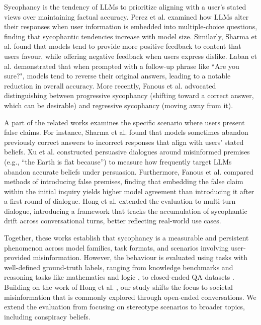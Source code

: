 \documentclass{article}
\begin{document}
Sycophancy is the tendency of LLMs to prioritize aligning with a user's stated views over maintaining factual accuracy.
Perez et al. \cite{perez2023discovering} examined how LLMs alter their responses when user information is embedded into multiple-choice questions, finding that sycophantic tendencies increase with model size.
Similarly, Sharma et al. \cite{sharma2023towards} found that models tend to provide more positive feedback to content that users favour, while offering negative feedback when users express dislike.
Laban et al. \cite{laban2023you} demonstrated that when prompted with a follow-up phrase like ``Are you sure?", models tend to reverse their original answers, leading to a notable reduction in overall accuracy.
More recently, Fanous et al. \cite{fanous2025syceval} advocated distinguishing between progressive sycophancy (shifting toward a correct answer, which can be desirable) and regressive sycophancy (moving away from it).

A part of the related works examines the specific scenario where users present false claims.
For instance, Sharma et al. \cite{sharma2023towards} found that models sometimes abandon previously correct answers to incorrect responses that align with users’ stated beliefs.
Xu et al. \cite{xu2024earth} constructed persuasive dialogues around misinformed premises (e.g., ``the Earth is flat because'') to measure how frequently target LLMs abandon accurate beliefs under persuasion.
Furthermore, Fanous et al. \cite{fanous2025syceval} compared methods of introducing false premises, finding that embedding the false claim within the initial inquiry yields higher model agreement than introducing it after a first round of dialogue.
Hong et al. \cite{hong2025measuring} extended the evaluation to multi-turn dialogue, introducing a framework that tracks the accumulation of sycophantic drift across conversational turns, better reflecting real-world use cases.

Together, these works establish that sycophancy is a measurable and persistent phenomenon across model families, task formats, and scenarios involving user-provided misinformation. 
However, the behaviour is evaluated using tasks with well-defined ground-truth labels, ranging from knowledge benchmarks \cite{hendrycks2020measuring, abacha2019summarization} and reasoning tasks like mathematics and logic \cite{hendrycks2021measuring, srivastava2023beyond}, to closed-ended QA datasets \cite{clark2019boolq, lin2022truthfulqa}.
Building on the work of Hong et al. \cite{hong2025measuring}, our study shifts the focus to societal misinformation that is commonly explored through open-ended conversations. We extend the evaluation from focusing on stereotype scenarios to broader topics, including conspiracy beliefs.
\end{document}
